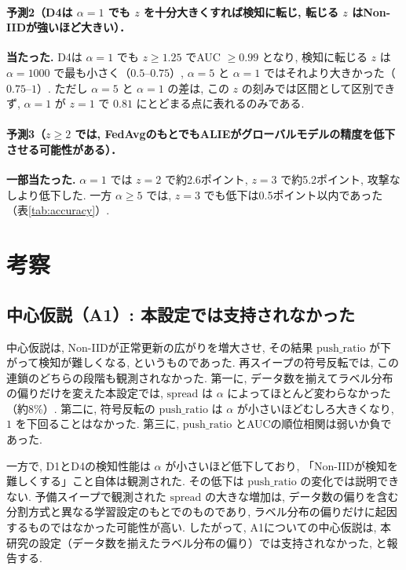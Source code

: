 \documentclass[a4j, twocolumn, dvipdfmx]{jsarticle}
\begin{document}
\paragraph{予測2（D4は $\alpha=1$ でも $z$ を十分大きくすれば検知に転じ, 転じる $z$ はNon-IIDが強いほど大きい）．}
\textbf{当たった.} D4は $\alpha=1$ でも $z \ge 1.25$ でAUC $\ge 0.99$ となり, 検知に転じる $z$ は $\alpha=1000$ で最も小さく（$0.5$--$0.75$）, $\alpha=5$ と $\alpha=1$ ではそれより大きかった（$0.75$--$1$）. ただし $\alpha=5$ と $\alpha=1$ の差は, この $z$ の刻みでは区間として区別できず, $\alpha=1$ が $z=1$ で $0.81$ にとどまる点に表れるのみである.

\paragraph{予測3（$z \ge 2$ では, FedAvgのもとでもALIEがグローバルモデルの精度を低下させる可能性がある）．}
\textbf{一部当たった.} $\alpha=1$ では $z=2$ で約2.6ポイント, $z=3$ で約5.2ポイント, 攻撃なしより低下した. 一方 $\alpha \ge 5$ では, $z=3$ でも低下は0.5ポイント以内であった（表\ref{tab:accuracy}）.

\section{考察}
\label{sec:discussion}

\subsection{中心仮説（A1）: 本設定では支持されなかった}

中心仮説は, Non-IIDが正常更新の広がりを増大させ, その結果 $\mathrm{push\_ratio}$ が下がって検知が難しくなる, というものであった. 再スイープの符号反転では, この連鎖のどちらの段階も観測されなかった. 第一に, データ数を揃えてラベル分布の偏りだけを変えた本設定では, $\mathrm{spread}$ は $\alpha$ によってほとんど変わらなかった（約8\%）. 第二に, 符号反転の $\mathrm{push\_ratio}$ は $\alpha$ が小さいほどむしろ大きくなり, $1$ を下回ることはなかった. 第三に, $\mathrm{push\_ratio}$ とAUCの順位相関は弱いか負であった.

一方で, D1とD4の検知性能は $\alpha$ が小さいほど低下しており, 「Non-IIDが検知を難しくする」こと自体は観測された. その低下は $\mathrm{push\_ratio}$ の変化では説明できない. 予備スイープで観測された $\mathrm{spread}$ の大きな増加は, データ数の偏りを含む分割方式と異なる学習設定のもとでのものであり, ラベル分布の偏りだけに起因するものではなかった可能性が高い. したがって, A1についての中心仮説は, 本研究の設定（データ数を揃えたラベル分布の偏り）では支持されなかった, と報告する.
\end{document}
